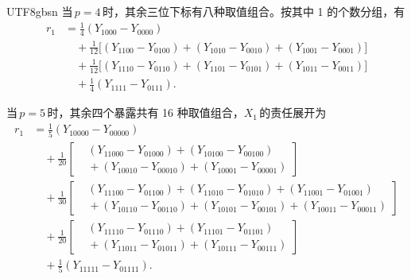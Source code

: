 \documentclass[11pt,a4paper]{article}
\begin{document}
\begin{CJK*}{UTF8}{gbsn}
当\,$p=4$\,时，其余三位下标有八种取值组合。按其中 1 的个数分组，有
\begin{equation}\label{eq:p4}
\begin{split}
r_1 &= \tfrac{1}{4}(Y_{1000}-Y_{0000}) \\[2pt]
    &\quad + \tfrac{1}{12}\bigl[(Y_{1100}-Y_{0100})+(Y_{1010}-Y_{0010})+(Y_{1001}-Y_{0001})\bigr] \\[2pt]
    &\quad + \tfrac{1}{12}\bigl[(Y_{1110}-Y_{0110})+(Y_{1101}-Y_{0101})+(Y_{1011}-Y_{0011})\bigr] \\[2pt]
    &\quad + \tfrac{1}{4}(Y_{1111}-Y_{0111}).
\end{split}
\end{equation}

\newpage
当\,$p=5$\,时，其余四个暴露共有 16 种取值组合，$X_1$\,的责任展开为
\begin{equation}\label{eq:p5}
\begin{split}
r_1 &= \tfrac{1}{5}(Y_{10000}-Y_{00000}) \\[2pt]
    &\quad + \tfrac{1}{20}\left[\begin{aligned}
        &(Y_{11000}-Y_{01000})+(Y_{10100}-Y_{00100}) \\
        &{}+(Y_{10010}-Y_{00010})+(Y_{10001}-Y_{00001})
      \end{aligned}\right] \\[2pt]
    &\quad + \tfrac{1}{30}\left[\begin{aligned}
        &(Y_{11100}-Y_{01100})+(Y_{11010}-Y_{01010})+(Y_{11001}-Y_{01001}) \\
        &{}+(Y_{10110}-Y_{00110})+(Y_{10101}-Y_{00101})+(Y_{10011}-Y_{00011})
      \end{aligned}\right] \\[2pt]
    &\quad + \tfrac{1}{20}\left[\begin{aligned}
        &(Y_{11110}-Y_{01110})+(Y_{11101}-Y_{01101}) \\
        &{}+(Y_{11011}-Y_{01011})+(Y_{10111}-Y_{00111})
      \end{aligned}\right] \\[2pt]
    &\quad + \tfrac{1}{5}(Y_{11111}-Y_{01111}).
\end{split}
\end{equation}


\end{CJK*}
\end{document}
